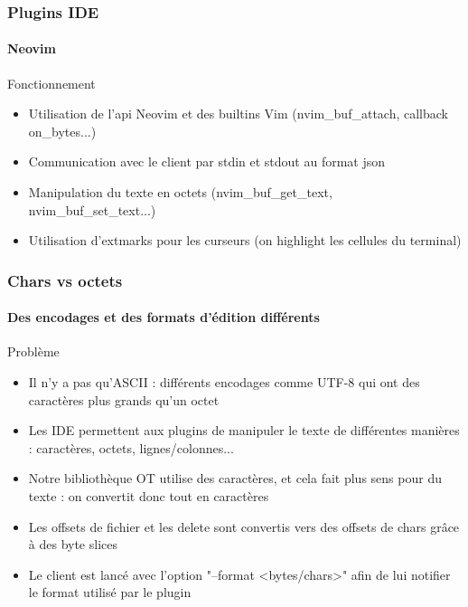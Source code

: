 \documentclass{beamer}
\begin{document}
\begin{frame}
    \frametitle{Plugins IDE}
    \framesubtitle{Neovim}
    \begin{block}{Fonctionnement}
        \begin{itemize}
            \item Utilisation de l'api Neovim et des builtins Vim (nvim\_buf\_attach, callback on\_bytes...)
            \item Communication avec le client par stdin et stdout au format json
            \item Manipulation du texte en octets (nvim\_buf\_get\_text, nvim\_buf\_set\_text...)
            \item Utilisation d'extmarks pour les curseurs (on highlight les cellules du terminal)
        \end{itemize}
    \end{block}
\end{frame}

\begin{frame}
    \frametitle{Chars vs octets}
    \framesubtitle{Des encodages et des formats d'édition différents}
    \begin{block}{Problème}
        \begin{itemize}
            \item Il n'y a pas qu'ASCII : différents encodages comme UTF-8 qui ont des caractères plus grands qu'un octet
            \item Les IDE permettent aux plugins de manipuler le texte de différentes manières : caractères, octets, lignes/colonnes...
            \item Notre bibliothèque OT utilise des caractères, et cela fait plus sens pour du texte : on convertit donc tout en caractères
            \item Les offsets de fichier et les delete sont convertis vers des offsets de chars grâce à des byte slices
            \item Le client est lancé avec l'option "--format <bytes/chars>" afin de lui notifier le format utilisé par le plugin
        \end{itemize}
    \end{block}
\end{frame}
\end{document}
